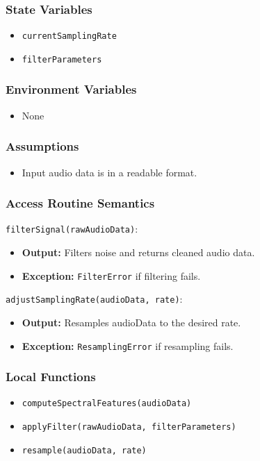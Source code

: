 \documentclass[12pt, titlepage]{article}
\begin{document}
\subsubsection{State Variables}  
\begin{itemize}  
    \item \texttt{currentSamplingRate}  
    \item \texttt{filterParameters}  
\end{itemize}  

\subsubsection{Environment Variables}  
\begin{itemize}  
    \item None  
\end{itemize}  

\subsubsection{Assumptions}  
\begin{itemize}  
    \item Input audio data is in a readable format.  
\end{itemize}  

\subsubsection{Access Routine Semantics}  

\noindent \texttt{filterSignal(rawAudioData)}:
\begin{itemize}  
    \item \textbf{Output:} Filters noise and returns cleaned audio data.  
    \item \textbf{Exception:} \texttt{FilterError} if filtering fails.  
\end{itemize}  

\noindent \texttt{adjustSamplingRate(audioData, rate)}:
\begin{itemize}  
    \item \textbf{Output:} Resamples audioData to the desired rate.  
    \item \textbf{Exception:} \texttt{ResamplingError} if resampling fails.  
\end{itemize}  

\subsubsection{Local Functions}  
\begin{itemize}  
    \item \texttt{computeSpectralFeatures(audioData)}
    \item \texttt{applyFilter(rawAudioData, filterParameters)}  
    \item \texttt{resample(audioData, rate)}  
\end{itemize}  
\end{document}
